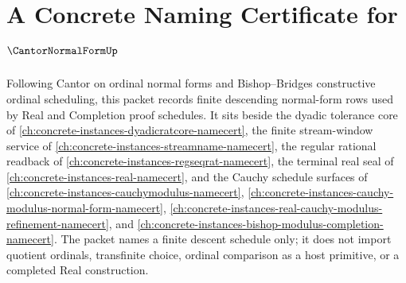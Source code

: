 \chapter{A Concrete Naming Certificate for $\CantorNormalFormUp$}
\label{ch:concrete-instances-cantor-normal-form-namecert}

Following Cantor on ordinal normal forms and Bishop--Bridges constructive ordinal scheduling, this packet records finite descending normal-form rows used by Real and Completion proof schedules. It sits beside the dyadic tolerance core of \autoref{ch:concrete-instances-dyadicratcore-namecert}, the finite stream-window service of \autoref{ch:concrete-instances-streamname-namecert}, the regular rational readback of \autoref{ch:concrete-instances-regseqrat-namecert}, the terminal real seal of \autoref{ch:concrete-instances-real-namecert}, and the Cauchy schedule surfaces of \autoref{ch:concrete-instances-cauchymodulus-namecert}, \autoref{ch:concrete-instances-cauchy-modulus-normal-form-namecert}, \autoref{ch:concrete-instances-real-cauchy-modulus-refinement-namecert}, and \autoref{ch:concrete-instances-bishop-modulus-completion-namecert}. The packet names a finite descent schedule only; it does not import quotient ordinals, transfinite choice, ordinal comparison as a host primitive, or a completed Real construction.

